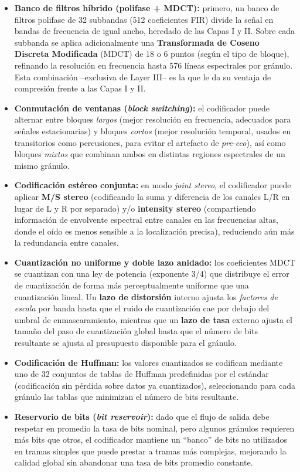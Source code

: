 \documentclass[pdflatex,sn-mathphys-num]{sn-jnl}%
\begin{document}
\begin{itemize}
    \item \textbf{Banco de filtros híbrido (polifase + MDCT):} primero, un banco de filtros polifase de 32 subbandas (512 coeficientes FIR) divide la señal en bandas de frecuencia de igual ancho, heredado de las Capas I y II. Sobre cada subbanda se aplica adicionalmente una \textbf{Transformada de Coseno Discreta Modificada} (MDCT) de 18 o 6 puntos (según el tipo de bloque), refinando la resolución en frecuencia hasta 576 líneas espectrales por gránulo. Esta combinación --exclusiva de Layer III-- es la que le da su ventaja de compresión frente a las Capas I y II.
    \item \textbf{Conmutación de ventanas (\textit{block switching}):} el codificador puede alternar entre bloques \textit{largos} (mejor resolución en frecuencia, adecuados para señales estacionarias) y bloques \textit{cortos} (mejor resolución temporal, usados en transitorios como percusiones, para evitar el artefacto de \textit{pre-eco}), así como bloques \textit{mixtos} que combinan ambos en distintas regiones espectrales de un mismo gránulo.
    \item \textbf{Codificación estéreo conjunta:} en modo \textit{joint stereo}, el codificador puede aplicar \textbf{M/S stereo} (codificando la suma y diferencia de los canales L/R en lugar de L y R por separado) y/o \textbf{intensity stereo} (compartiendo información de envolvente espectral entre canales en las frecuencias altas, donde el oído es menos sensible a la localización precisa), reduciendo aún más la redundancia entre canales.
    \item \textbf{Cuantización no uniforme y doble lazo anidado:} los coeficientes MDCT se cuantizan con una ley de potencia (exponente 3/4) que distribuye el error de cuantización de forma más perceptualmente uniforme que una cuantización lineal. Un \textbf{lazo de distorsión} interno ajusta los \textit{factores de escala} por banda hasta que el ruido de cuantización cae por debajo del umbral de enmascaramiento, mientras que un \textbf{lazo de tasa} externo ajusta el tamaño del paso de cuantización global hasta que el número de bits resultante se ajusta al presupuesto disponible para el gránulo.
    \item \textbf{Codificación de Huffman:} los valores cuantizados se codifican mediante uno de 32 conjuntos de tablas de Huffman predefinidas por el estándar (codificación sin pérdida sobre datos ya cuantizados), seleccionando para cada gránulo las tablas que minimizan el número de bits resultante.
    \item \textbf{Reservorio de bits (\textit{bit reservoir}):} dado que el flujo de salida debe respetar en promedio la tasa de bits nominal, pero algunos gránulos requieren más bits que otros, el codificador mantiene un ``banco'' de bits no utilizados en tramas simples que puede prestar a tramas más complejas, mejorando la calidad global sin abandonar una tasa de bits promedio constante.
\end{itemize}
\end{document}
